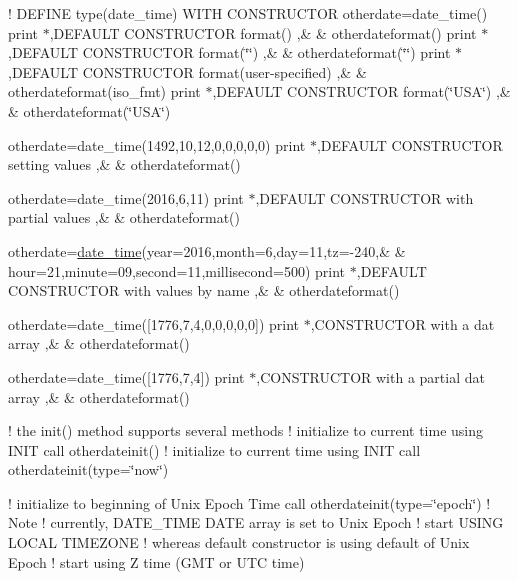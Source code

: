 ! D\+E\+F\+I\+NE type(date\+\_\+time) W\+I\+TH C\+O\+N\+S\+T\+R\+U\+C\+T\+OR otherdate=date\+\_\+time() print $\ast$,\textquotesingle{}D\+E\+F\+A\+U\+LT C\+O\+N\+S\+T\+R\+U\+C\+T\+OR format() \textquotesingle{},\& \& otherdateformat() print $\ast$,\textquotesingle{}D\+E\+F\+A\+U\+LT C\+O\+N\+S\+T\+R\+U\+C\+T\+OR format(\char`\"{}\char`\"{}) \textquotesingle{},\& \& otherdateformat(\char`\"{}\char`\"{}) print $\ast$,\textquotesingle{}D\+E\+F\+A\+U\+LT C\+O\+N\+S\+T\+R\+U\+C\+T\+OR format(user-\/specified) \textquotesingle{},\& \& otherdateformat(iso\+\_\+fmt) print $\ast$,\textquotesingle{}D\+E\+F\+A\+U\+LT C\+O\+N\+S\+T\+R\+U\+C\+T\+OR format(\char`\"{}\+U\+S\+A\char`\"{}) \textquotesingle{},\& \& otherdateformat(\char`\"{}\+U\+S\+A\char`\"{})

otherdate=date\+\_\+time(1492,10,12,0,0,0,0,0) print $\ast$,\textquotesingle{}D\+E\+F\+A\+U\+LT C\+O\+N\+S\+T\+R\+U\+C\+T\+OR setting values \textquotesingle{},\& \& otherdateformat()

otherdate=date\+\_\+time(2016,6,11) print $\ast$,\textquotesingle{}D\+E\+F\+A\+U\+LT C\+O\+N\+S\+T\+R\+U\+C\+T\+OR with partial values \textquotesingle{},\& \& otherdateformat()

otherdate=\mbox{\hyperlink{structm__time__oop_1_1date__time}{date\+\_\+time}}(year=2016,month=6,day=11,tz=-\/240,\& \& hour=21,minute=09,second=11,millisecond=500) print $\ast$,\textquotesingle{}D\+E\+F\+A\+U\+LT C\+O\+N\+S\+T\+R\+U\+C\+T\+OR with values by name \textquotesingle{},\& \& otherdateformat()

otherdate=date\+\_\+time(\mbox{[}1776,7,4,0,0,0,0,0\mbox{]}) print $\ast$,\textquotesingle{}C\+O\+N\+S\+T\+R\+U\+C\+T\+OR with a dat array \textquotesingle{},\& \& otherdateformat()

otherdate=date\+\_\+time(\mbox{[}1776,7,4\mbox{]}) print $\ast$,\textquotesingle{}C\+O\+N\+S\+T\+R\+U\+C\+T\+OR with a partial dat array \textquotesingle{},\& \& otherdateformat()

! the init() method supports several methods ! initialize to current time using I\+N\+IT call otherdateinit() ! initialize to current time using I\+N\+IT call otherdateinit(type=\char`\"{}now\char`\"{})

! initialize to beginning of Unix Epoch Time call otherdateinit(type=\char`\"{}epoch\char`\"{}) ! Note ! currently, D\+A\+T\+E\+\_\+\+T\+I\+ME D\+A\+TE array is set to Unix Epoch ! start U\+S\+I\+NG L\+O\+C\+AL T\+I\+M\+E\+Z\+O\+NE ! whereas default constructor is using default of Unix Epoch ! start using Z time (G\+MT or U\+TC time)

